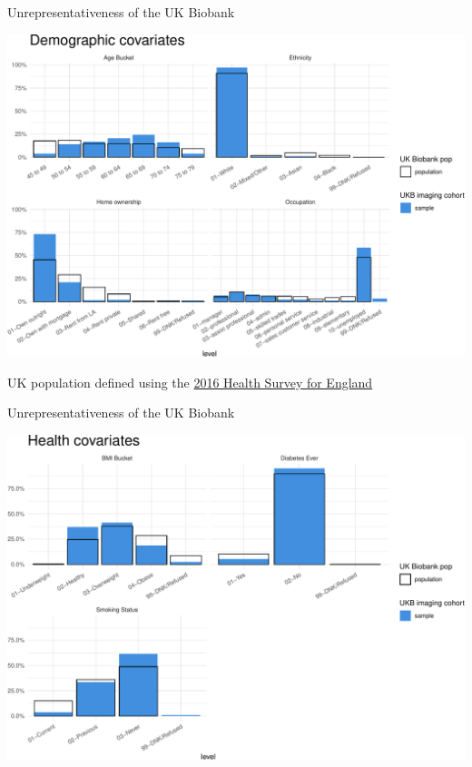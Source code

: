 \documentclass[
  ignorenonframetext,
]{beamer}
\begin{document}
\begin{frame}{Unrepresentativeness of the UK Biobank}
\protect\hypertarget{unrepresentativeness-of-the-uk-biobank}{}

\begin{center}\includegraphics[width=0.95\linewidth]{fmrib-deck-20191002_files/figure-beamer/plot-selection-bias-demos-1} \end{center}

UK population defined using the
\href{https://digital.nhs.uk/data-and-information/publications/statistical/health-survey-for-england/health-survey-for-england-2016}{2016
Health Survey for England}

\end{frame}

\begin{frame}{Unrepresentativeness of the UK Biobank}
\protect\hypertarget{unrepresentativeness-of-the-uk-biobank-1}{}

\begin{center}\includegraphics[width=0.95\linewidth]{fmrib-deck-20191002_files/figure-beamer/plot-selection-bias-health-1} \end{center}

\end{frame}
\end{document}
